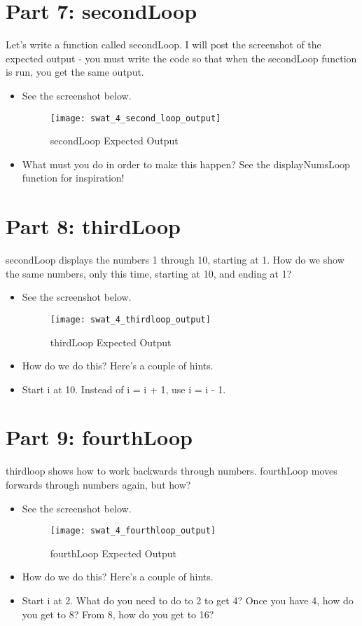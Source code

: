 \documentclass{article}
\begin{document}
\section*{Part 7: secondLoop}
Let's write a function called secondLoop.  I will post the screenshot of the expected output - you must write the code so that when the secondLoop function is run, you get the same output.
\begin{itemize}
	\item See the screenshot below.
	\begin{figure}[H]
  		\centering
  		\texttt{[image: swat\_4\_second\_loop\_output]}
  		\caption{secondLoop Expected Output }
	\end{figure}
	\item What must you do in order to make this happen?  See the displayNumsLoop function for inspiration!
\end{itemize}

\section*{Part 8: thirdLoop}
secondLoop displays the numbers 1 through 10, starting at 1.  How do we show the same numbers, only this time, starting at 10, and ending at 1?
\begin{itemize}
	\item See the screenshot below.
	\begin{figure}[H]
  		\centering
  		\texttt{[image: swat\_4\_thirdloop\_output]}
  		\caption{thirdLoop Expected Output }
	\end{figure}
	\item How do we do this?  Here's a couple of hints.
	\item Start i at 10.  Instead of i = i + 1, use i = i - 1.
\end{itemize}

\section*{Part 9: fourthLoop}
thirdloop shows how to work backwards through numbers.  fourthLoop moves forwards through numbers again, but how?
\begin{itemize}
	\item See the screenshot below.
	\begin{figure}[H]
  		\centering
  		\texttt{[image: swat\_4\_fourthloop\_output]}
  		\caption{fourthLoop Expected Output }
	\end{figure}
	\item How do we do this?  Here's a couple of hints.
	\item Start i at 2.  What do you need to do to 2 to get 4?  Once you have 4, how do you get to 8?  From 8, how do you get to 16?
\end{itemize}
\end{document}
